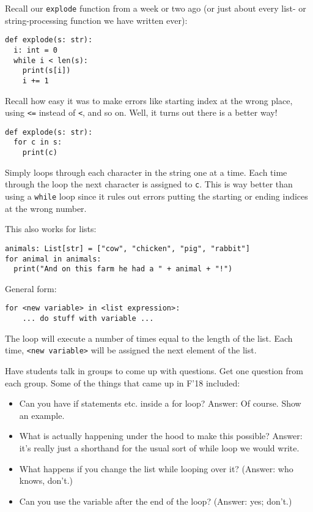 \documentclass{article}
\begin{document}
Recall our \verb|explode| function from a week or two ago (or just
about every list- or string-processing function we have written ever):
\begin{verbatim}
def explode(s: str):
  i: int = 0
  while i < len(s):
    print(s[i])
    i += 1
\end{verbatim}
Recall how easy it was to make errors like starting index at the wrong
place, using \verb|<=| instead of \verb|<|, and so on.  Well, it turns
out there is a better way!
\begin{verbatim}
def explode(s: str):
  for c in s:
    print(c)
\end{verbatim}
Simply loops through each character in the string one at a time.  Each
time through the loop the next character is assigned to \verb|c|.
This is way better than using a \verb|while| loop since it rules out
errors putting the starting or ending indices at the wrong number.

This also works for lists:
\begin{verbatim}
animals: List[str] = ["cow", "chicken", "pig", "rabbit"]
for animal in animals:
  print("And on this farm he had a " + animal + "!")
\end{verbatim}

General form:
\begin{verbatim}
for <new variable> in <list expression>:
    ... do stuff with variable ...
\end{verbatim}

The loop will execute a number of times equal to the length of the
list.  Each time, \verb|<new variable>| will be assigned the next
element of the list.

Have students talk in groups to come up with questions.  Get one
question from each group.  Some of the things that came up in F'18
included:

\begin{itemize}
\item Can you have if statements etc. inside a for loop?  Answer: Of
  course.  Show an example.
\item What is actually happening under the hood to make this possible?
  Answer: it's really just a shorthand for the usual sort of while
  loop we would write.
\item What happens if you change the list while looping over it?
  (Answer: who knows, don't.)
\item Can you use the variable after the end of the loop? (Answer:
  yes; don't.)
\end{itemize}
\end{document}
